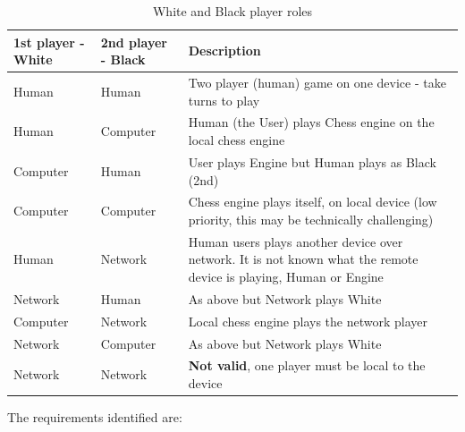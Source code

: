 \documentclass[a4paper,10pt]{article}
\begin{document}
\begin{table}[H]
\caption{White and Black player roles}
\label{table:WBRoles}
\begin{tabular}{|| p{2cm} | p{2cm} | p{11cm} ||}\hline

\textbf{1st player - White} &\textbf{2nd player - Black} & Description\\
\hline
Human & Human & Two player (human) game on one device - take turns to play \\
Human & Computer & Human (the User) plays Chess engine on the local chess engine\\
Computer & Human & User plays Engine but Human plays as Black (2nd)\\
Computer & Computer & Chess engine plays itself, on local device (low priority, this may be technically challenging)\\
Human& Network & Human users plays another device over network. It is not known what the remote device is playing, Human or Engine\\
Network & Human & As above but Network plays White\\
Computer & Network & Local chess engine plays the network player\\
Network & Computer & As above but Network plays White\\
Network & Network & \textbf{Not valid}, one player must be local to the device \\
\hline
\end{tabular}
\end{table}



The requirements identified are:
\end{document}
